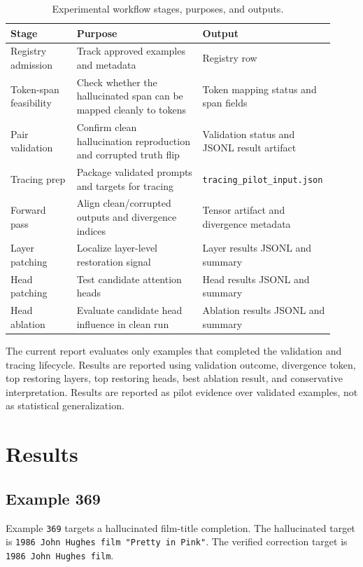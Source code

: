 \documentclass[11pt]{article}
\begin{document}
\begin{table}[t]
\caption{Experimental workflow stages, purposes, and outputs.}
\centering
\small
\begin{tabular}{p{0.20\linewidth}p{0.38\linewidth}p{0.34\linewidth}}
\toprule
\textbf{Stage} & \textbf{Purpose} & \textbf{Output} \\
\midrule
Registry admission & Track approved examples and metadata & Registry row \\
Token-span feasibility & Check whether the hallucinated span can be mapped cleanly to tokens & Token mapping status and span fields \\
Pair validation & Confirm clean hallucination reproduction and corrupted truth flip & Validation status and JSONL result artifact \\
Tracing prep & Package validated prompts and targets for tracing & \texttt{tracing\_pilot\_input.json} \\
Forward pass & Align clean/corrupted outputs and divergence indices & Tensor artifact and divergence metadata \\
Layer patching & Localize layer-level restoration signal & Layer results JSONL and summary \\
Head patching & Test candidate attention heads & Head results JSONL and summary \\
Head ablation & Evaluate candidate head influence in clean run & Ablation results JSONL and summary \\
\bottomrule
\end{tabular}

\label{tab:workflow}
\end{table}

The current report evaluates only examples that completed the validation and tracing lifecycle. Results are reported using validation outcome, divergence token, top restoring layers, top restoring heads, best ablation result, and conservative interpretation. Results are reported as pilot evidence over validated examples, not as statistical generalization.

\section{Results}

\subsection{Example 369}

Example \texttt{369} targets a hallucinated film-title completion. The hallucinated target is \texttt{1986 John Hughes film "Pretty in Pink"}. The verified correction target is \texttt{1986 John Hughes film}.
\end{document}
